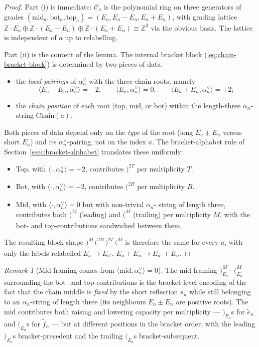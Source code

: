 \documentclass[11pt]{article}
\theoremstyle{definition}
\theoremstyle{remark}
\newtheorem{remark}[theorem]{Remark}
\newcommand{\Chain}{\mathrm{Chain}}
\newcommand{\Z}{\mathbb{Z}}
\newcommand{\Cmid}{\mathcal{C}}
\newcommand{\labr}[1]{{)}_{#1}}
\newcommand{\labl}[1]{{(}_{#1}}
\begin{document}
\begin{proof}
Part (i) is immediate: $\Cmid_a$ is the polynomial ring on three generators of grades
$(\mathrm{mid}_a, \mathrm{bot}_a, \mathrm{top}_a) = (E_a, E_a - E_n, E_a + E_n)$, with grading
lattice $\Z \cdot E_a \oplus \Z \cdot (E_a - E_n) \oplus \Z \cdot (E_a + E_n) \cong \Z^3$ via
the obvious basis. The lattice is independent of $a$ up to relabelling.

Part (ii) is the content of the lemma. The internal bracket block (\ref{eq:chain-bracket-block})
is determined by two pieces of data:
\begin{itemize}[leftmargin=2em]
  \item the \emph{local pairings} of $\alpha_n^\vee$ with the three chain roots, namely
    \[
    \langle E_a - E_n, \alpha_n^\vee\rangle = -2, \qquad \langle E_a, \alpha_n^\vee\rangle = 0, \qquad \langle E_a + E_n, \alpha_n^\vee\rangle = +2;
    \]
  \item the \emph{chain position} of each root (top, mid, or bot) within the length-three
    $\alpha_n$-string $\Chain(a)$.
\end{itemize}
Both pieces of data depend only on the \emph{type} of the root (long $E_a \pm E_n$ versus
short $E_a$) and its $\alpha_n^\vee$-pairing, not on the index $a$. The bracket-alphabet
rule of Section~\ref{ssec:bracket-alphabet} translates these uniformly:
\begin{itemize}[leftmargin=2em]
  \item Top, with $\langle \cdot, \alpha_n^\vee\rangle = +2$, contributes $\labr{}^{2T}$ per
    multiplicity $T$.
  \item Bot, with $\langle \cdot, \alpha_n^\vee\rangle = -2$, contributes $\labl{}^{2B}$ per
    multiplicity $B$.
  \item Mid, with $\langle \cdot, \alpha_n^\vee\rangle = 0$ but with non-trivial $\alpha_n$-
    string of length three, contributes both $\labr{}^M$ (leading) and $\labl{}^M$ (trailing)
    per multiplicity $M$, with the bot- and top-contributions sandwiched between them.
\end{itemize}
The resulting block shape $\labr{}^M\, \labl{}^{2B}\, \labr{}^{2T}\, \labl{}^M$ is therefore
the same for every $a$, with only the labels relabelled $E_a \to E_{a'}$, $E_a \pm E_n \to
E_{a'} \pm E_n$.
\end{proof}

\begin{remark}[Mid-framing comes from $\langle \mathrm{mid}, \alpha_n^\vee\rangle = 0$]\label{rmk:mid-framing}
The mid framing $\labr{E_a}^M \cdots \labl{E_a}^M$ surrounding the bot- and top-contributions
is the bracket-level encoding of the fact that the chain middle is \emph{fixed} by the short
reflection $s_n$ while still belonging to an $\alpha_n$-string of length three (its neighbours
$E_a \pm E_n$ are positive roots). The mid contributes both raising and lowering capacity per
multiplicity --- $\labr{E_a}$s for $\tilde e_n$ and $\labl{E_a}$s for $\tilde f_n$ --- but at
different positions in the bracket order, with the leading $\labr{E_a}$s bracket-precedent and
the trailing $\labl{E_a}$s bracket-subsequent.
\end{remark}
\end{document}
